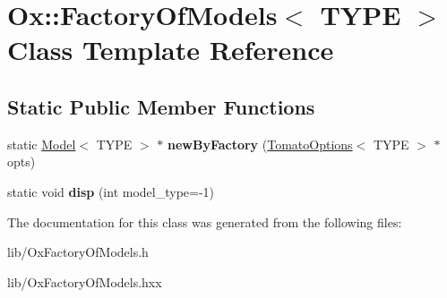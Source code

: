 \hypertarget{class_ox_1_1_factory_of_models}{\section{Ox\-:\-:Factory\-Of\-Models$<$ T\-Y\-P\-E $>$ Class Template Reference}
\label{class_ox_1_1_factory_of_models}
}
\subsection*{Static Public Member Functions}
\begin{DoxyCompactItemize}
\item 
\hypertarget{class_ox_1_1_factory_of_models_adb04f53af47233f441be4282a1574142}{static \hyperlink{class_ox_1_1_model}{Model}$<$ T\-Y\-P\-E $>$ $\ast$ {\bfseries new\-By\-Factory} (\hyperlink{struct_ox_1_1_tomato_options}{Tomato\-Options}$<$ T\-Y\-P\-E $>$ $\ast$opts)}\label{class_ox_1_1_factory_of_models_adb04f53af47233f441be4282a1574142}

\item 
\hypertarget{class_ox_1_1_factory_of_models_a39b543260deef66d9d8bbffbbbc9d8de}{static void {\bfseries disp} (int model\-\_\-type=-\/1)}\label{class_ox_1_1_factory_of_models_a39b543260deef66d9d8bbffbbbc9d8de}

\end{DoxyCompactItemize}


The documentation for this class was generated from the following files\-:\begin{DoxyCompactItemize}
\item 
lib/Ox\-Factory\-Of\-Models.\-h\item 
lib/Ox\-Factory\-Of\-Models.\-hxx\end{DoxyCompactItemize}
